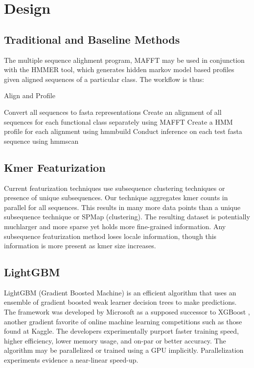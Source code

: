 \section{Design}
\subsection{Traditional and Baseline Methods}
The multiple sequence alighment program, MAFFT \cite {MAFFT} may be used in conjunction with the HMMER \cite {HMMER3} tool, which generates hidden markov model based profiles given aligned sequences of a particular class. The workflow is thus:

\begin{algorithm}
\caption{Align and Profile}\label{euclid}
\begin{algorithmic}[1]
\State Convert all sequences to fasta representations
\State Create an alignment of all sequences for each functional class separately using MAFFT
\State Create a HMM profile for each alignment using hmmbuild
\State Conduct inference on each test fasta sequence using hmmscan
\end{algorithmic}
\end{algorithm}

\subsection{Kmer Featurization}
Current featurization techniques use subsequence clustering techniques or presence of unique subsequences. Our technique aggregates kmer counts in parallel for all sequences. This results in many more data points than a unique subsequence technique or SPMap (clustering). The resulting dataset is potentially muchlarger and more sparse yet holds more fine-grained information. Any subsequence featurization method loses locale information, though this information is more present as kmer size increases.

\subsection{LightGBM}
LightGBM (Gradient Boosted Machine) \cite {LGBM} is an efficient algorithm that uses an ensemble of gradient boosted weak learner decision trees to make predictions. The framework was developed by Microsoft as a supposed successor to XGBoost \cite {Chen:2016:XST:2939672.2939785}, another gradient favorite of online machine learning competitions such as those found at Kaggle. The developers experimentally purport faster training speed, higher efficiency, lower memory usage, and on-par or better accuracy. The algorithm may be parallelized or trained using a GPU implicitly. Parallelization experiments evidence a near-linear speed-up.

